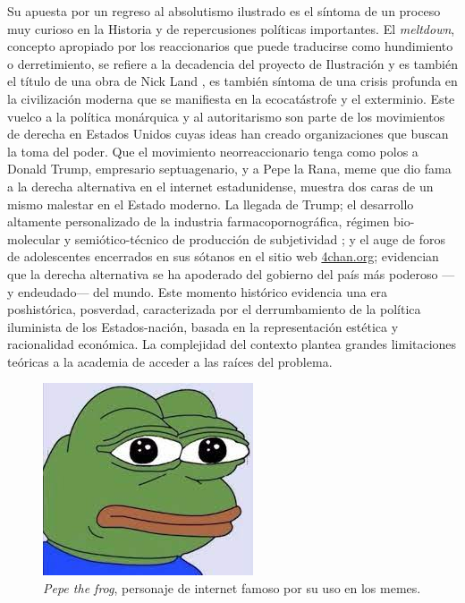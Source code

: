Su apuesta por un regreso al absolutismo ilustrado es el síntoma de un proceso muy curioso en la Historia y de repercusiones políticas importantes. El \emph{meltdown}, concepto apropiado por los reaccionarios que puede traducirse como hundimiento o derretimiento, se refiere a la decadencia del proyecto de Ilustración y es también el título de una obra de Nick Land \autocite{landFangedNoumenaCollected2018}, es también síntoma de una crisis profunda en la civilización moderna que se manifiesta en la ecocatástrofe y el exterminio. Este vuelco a la política monárquica y al autoritarismo son parte de los movimientos de derecha en Estados Unidos cuyas ideas han creado organizaciones que buscan la toma del poder. Que el movimiento neorreaccionario tenga como polos a Donald Trump, empresario septuagenario, y a Pepe la Rana, meme que dio fama a la derecha alternativa \autocite{huiUnhappyConsciousnessNeoreactionaries2017} en el internet estadunidense, muestra dos caras de un mismo malestar en el Estado moderno. La llegada de Trump; el desarrollo altamente personalizado de la industria farmacopornográfica, régimen bio-molecular y semiótico-técnico de producción de subjetividad \autocite{preciadoTestoYonqui2008}; y el auge de foros de adolescentes encerrados en sus sótanos en el sitio web \url{4chan.org}; evidencian que la derecha alternativa se ha apoderado del gobierno del país más poderoso ---y endeudado--- del mundo. Este momento histórico evidencia una era poshistórica, posverdad, caracterizada por el derrumbamiento de la política iluminista de los Estados-nación, basada en la representación estética y racionalidad económica. La complejidad del contexto plantea grandes limitaciones teóricas a la academia de acceder a las raíces del problema.

\begin{figure}[htb]
  \centering
  \includegraphics[width=0.7\linewidth]{images/pepe.jpg}
  \caption{\emph{Pepe the frog}, personaje de internet famoso por su uso en los memes.}
  \label{fig:pepe}
\end{figure}

